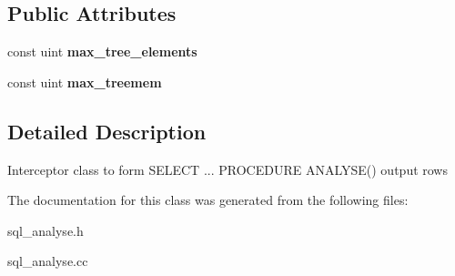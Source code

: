 \subsection*{Public Attributes}
\begin{DoxyCompactItemize}
\item 
\mbox{\label{classQuery__result__analyse_acc5320e1c9d4e7b447f217b4b78e1e4e}} 
const uint {\bfseries max\+\_\+tree\+\_\+elements}
\item 
\mbox{\label{classQuery__result__analyse_ac1b2388587ca6004c16f32f6af23b7cd}} 
const uint {\bfseries max\+\_\+treemem}
\end{DoxyCompactItemize}


\subsection{Detailed Description}
Interceptor class to form S\+E\+L\+E\+CT ... P\+R\+O\+C\+E\+D\+U\+RE A\+N\+A\+L\+Y\+S\+E() output rows 

The documentation for this class was generated from the following files\+:\begin{DoxyCompactItemize}
\item 
sql\+\_\+analyse.\+h\item 
sql\+\_\+analyse.\+cc\end{DoxyCompactItemize}
